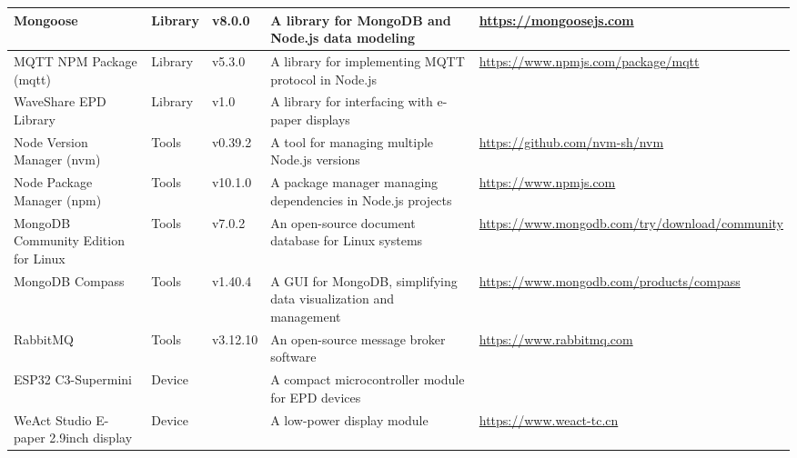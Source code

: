 \documentclass[../Main.tex]{subfiles}
\begin{document}
\begin{table}[H]
\begin{tabular}{| m{3cm} | m{1cm} | m{1.4cm} | m{4cm} | m{4cm} |}
        Mongoose                                & Library       & v8.0.0            & A library for MongoDB and Node.js data modeling                   & \url{https://mongoosejs.com}                                      \\ \hline
        MQTT NPM Package (mqtt)                 & Library       & v5.3.0            & A library for implementing MQTT protocol in Node.js               & \url{https://www.npmjs.com/package/mqtt}                          \\ \hline
        WaveShare EPD Library                   & Library       & v1.0              & A library for interfacing with e-paper displays                   &                                                                   \\ \hline
        Node Version Manager (nvm)              & Tools         & v0.39.2           & A tool for managing multiple Node.js versions                     & \url{https://github.com/nvm-sh/nvm}                               \\ \hline
        Node Package Manager (npm)              & Tools         & v10.1.0           & A package manager managing dependencies in Node.js projects       & \url{https://www.npmjs.com}                                       \\ \hline
        MongoDB Community Edition for Linux     & Tools         & v7.0.2            & An open-source document database for Linux systems                & \url{https://www.mongodb.com/try/download/community}              \\ \hline
        MongoDB Compass                         & Tools         & v1.40.4           & A GUI for MongoDB, simplifying data visualization and management  & \url{https://www.mongodb.com/products/compass}                    \\ \hline
        RabbitMQ                                & Tools         & v3.12.10          & An open-source message broker software                            & \url{https://www.rabbitmq.com}                                    \\ \hline
        ESP32 C3-Supermini                      & Device        &                   & A compact microcontroller module for EPD devices                  &                                                                   \\ \hline
        WeAct Studio E-paper 2.9inch display    & Device        &                   & A low-power display module                                        & \url{https://www.weact-tc.cn}                                     \\ \hline

\end{tabular}
\end{table}
\end{document}
